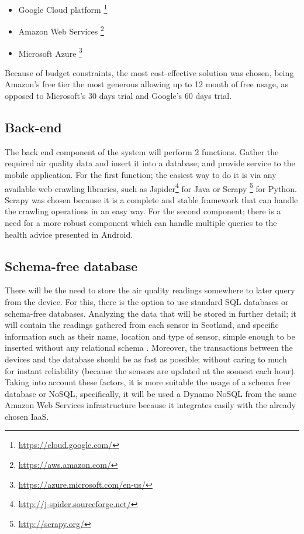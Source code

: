 \begin{itemize}
	\item Google Cloud platform \footnote{\url{https://cloud.google.com/}}
    \item Amazon Web Services \footnote{\url{https://aws.amazon.com/}}
    \item Microsoft Azure \footnote{\url{https://azure.microsoft.com/en-us/}}
\end{itemize}

Because of budget constraints, the most cost-effective solution was chosen, being Amazon's free tier the most generous allowing up to 12 month of free usage, as opposed to Microsoft's 30 days trial and Google's 60 days trial.

\subsection{Back-end}
The back end component of the system will perform 2 functions. Gather the required air quality data and insert it into a database; and provide service to the mobile application. For the  first function; the easiest way to do it is via any available web-crawling libraries, such as Jspider\footnote{\url{http://j-spider.sourceforge.net/}} for Java or Scrapy \footnote{\url{http://scrapy.org/}} for Python. Scrapy was chosen because it is a complete and stable framework that can handle the crawling operations in an easy way. 
For the second component; there is a need for a more robust component which can handle multiple queries to the health advice presented in Android. 

\subsection{Schema-free database}
There will be the need to store the air quality readings somewhere to later query from the device. For this, there is the option to use standard SQL databases or schema-free databases. Analyzing the data that will be stored in further detail; it will contain the readings gathered from each sensor in Scotland, and specific information such as their name, location and type of sensor, simple enough to be inserted without any relational schema . Moreover, the transactions between the devices and the database should be as fast as possible; without caring to much for instant reliability (because the sensors are updated at the soonest each hour). Taking into account these factors, it is more suitable the usage of a schema free database or NoSQL, specifically, it will be used a Dynamo NoSQL from the same Amazon Web Services infrastructure because it integrates easily with the already chosen IaaS. 


